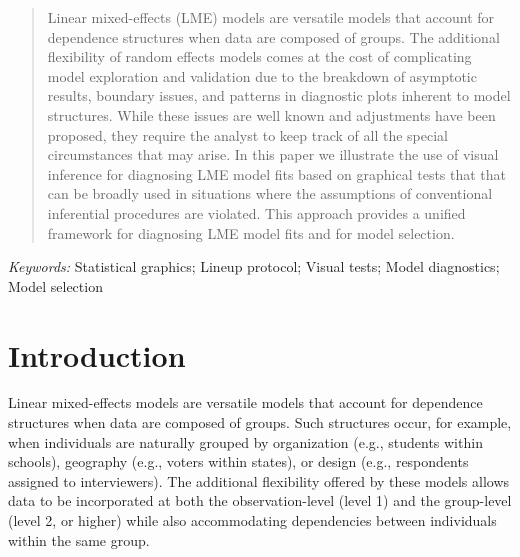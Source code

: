 \documentclass[12pt]{article}
\newcommand{\hhnote}[1]{\todo[inline,color=orange!40]{#1}}
\begin{document}
\bigskip
\begin{abstract}
Linear mixed-effects (LME) models are versatile models that account for dependence structures when data are composed of groups.
The additional flexibility of random effects models comes at the cost of complicating model exploration and validation
due to the breakdown of asymptotic results, boundary issues, and  patterns
in diagnostic plots inherent to model structures. While these issues are well known and adjustments
have been proposed, they require the analyst to keep track of all the special circumstances that
may arise. In this paper we illustrate the use of visual inference for diagnosing LME 
model fits based on graphical tests that that can be broadly used in situations where 
the assumptions of conventional inferential procedures are violated. This approach
provides a unified framework for diagnosing LME model fits and for model selection.
\end{abstract}

{\it Keywords:} Statistical graphics; Lineup protocol; Visual tests; Model diagnostics;  Model selection
\vfill

\clearpage
{}
\section{Introduction}

Linear mixed-effects models are versatile models that account for dependence structures when data are composed of groups.
Such structures occur, for example, when individuals are naturally grouped by organization (e.g., students within schools), geography (e.g., voters within states), or design (e.g., respondents assigned to  interviewers). The additional flexibility offered by these models allows data to be incorporated at both the observation-level (level 1) and the group-level (level 2, or higher) while also accommodating dependencies between individuals within the same group. 
\end{document}
